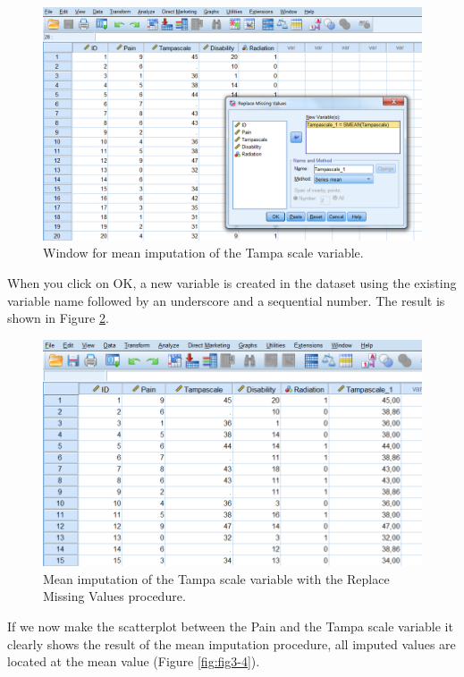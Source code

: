 \documentclass[
]{book}
\begin{document}
\begin{figure}

{\centering \includegraphics[width=0.7\linewidth]{images/fig3.6} 

}

\caption{Window for mean imputation of the Tampa scale variable.}\label{fig:fig3-3}
\end{figure}

When you click on OK, a new variable is created in the dataset using the existing variable name followed by an underscore and a sequential number. The result is shown in Figure \ref{fig:fig3-7}.

\begin{figure}

{\centering \includegraphics[width=0.7\linewidth]{images/fig3.7} 

}

\caption{Mean imputation of the Tampa scale variable with the Replace Missing Values procedure.}\label{fig:fig3-7}
\end{figure}

If we now make the scatterplot between the Pain and the Tampa scale variable it clearly shows the result of the mean imputation procedure, all imputed values are located at the mean value (Figure \ref{fig:fig3-4}).
\end{document}
